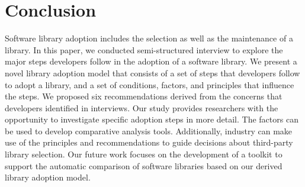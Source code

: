 
\section{Conclusion}
Software library adoption includes the selection as well as the maintenance of a library. In this paper, we conducted \numInterviews semi-structured interview to explore the major steps developers follow in the adoption of a software library. We present a novel library adoption model that consists of a set of steps that developers follow to adopt a library, and a set of conditions, factors, and principles that influence the steps. We proposed six recommendations derived from the concerns that developers identified in interviews. Our study provides researchers with the opportunity to investigate specific adoption steps in more detail. The factors can be used to develop comparative analysis tools. Additionally, industry can make use of the principles and recommendations to guide decisions about third-party library selection. Our future work focuses on the development of a toolkit to support the automatic comparison of software libraries based on our derived library adoption model.





 


